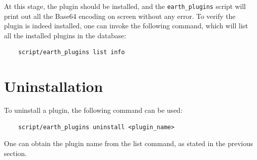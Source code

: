 \documentclass{article}
\begin{document}
At this stage, the plugin should be installed, and the \texttt{earth\_plugins} script will print out all the Base64 encoding on screen without any error. To verify the plugin is indeed installed, one can invoke the following command, which will list all the installed plugins in the database:

\begin{verbatim}
    script/earth_plugins list info
\end{verbatim}


\section{Uninstallation} %
\label{sec:uninstallation}

To uninstall a plugin, the following command can be used:

\begin{verbatim}
    script/earth_plugins uninstall <plugin_name>
\end{verbatim}

One can obtain the plugin name from the list command, as stated in the previous section.

\end{document}
